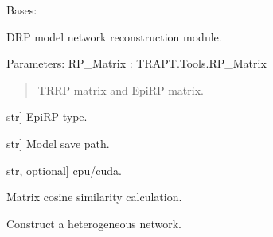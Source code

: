 \documentclass[letterpaper,10pt,english]{sphinxmanual}
\begin{document}
\begin{fulllineitems}
\label{\detokenize{index:TRAPT.DLVGAE.CalcSTM}}
\pysigstartsignatures
{}
\pysigstopsignatures
\sphinxAtStartPar
Bases: 

\sphinxAtStartPar
D\sphinxhyphen{}RP model network reconstruction module.

\sphinxAtStartPar
Parameters:
RP\_Matrix : TRAPT.Tools.RP\_Matrix
\begin{quote}

\sphinxAtStartPar
TR\sphinxhyphen{}RP matrix and Epi\sphinxhyphen{}RP matrix.
\end{quote}
\begin{description}
\sphinxlineitem{type}{[}str{]}
\sphinxAtStartPar
Epi\sphinxhyphen{}RP type.

\sphinxlineitem{checkpoint\_path}{[}str{]}
\sphinxAtStartPar
Model save path.

\sphinxlineitem{device}{[}str, optional{]}
\sphinxAtStartPar
cpu/cuda.

\end{description}

\begin{fulllineitems}
\label{\detokenize{index:TRAPT.DLVGAE.CalcSTM.get_cos_similar_matrix}}
\pysigstartsignatures
{}
\pysigstopsignatures
\sphinxAtStartPar
Matrix cosine similarity calculation.

\end{fulllineitems}


\begin{fulllineitems}
\label{\detokenize{index:TRAPT.DLVGAE.CalcSTM.get_edge_index}}
\pysigstartsignatures
{}
\pysigstopsignatures
\sphinxAtStartPar
Construct a heterogeneous network.


\end{fulllineitems}
\end{fulllineitems}
\end{document}
